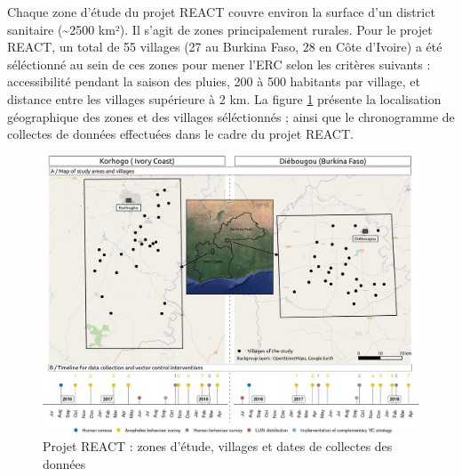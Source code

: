 \documentclass[12pt,twoside]{reedthesis}
\begin{document}
Chaque zone d'étude du projet REACT couvre environ la surface d'un district sanitaire (\textasciitilde2500 km²). Il s'agit de zones principalement rurales. Pour le projet REACT, un total de 55 villages (27 au Burkina Faso, 28 en Côte d'Ivoire) a été séléctionné au sein de ces zones pour mener l'ERC selon les critères suivants : accessibilité pendant la saison des pluies, 200 à 500 habitants par village, et distance entre les villages supérieure à 2 km. La figure \ref{fig:study-areas} présente la localisation géographique des zones et des villages séléctionnés ; ainsi que le chronogramme de collectes de données effectuées dans le cadre du projet REACT.
\begin{figure}

{\centering \includegraphics[width=1\linewidth]{figure/carte_zones_react} 

}

\caption[Zones d'étude et villages du projet REACT]{Projet REACT : zones d'étude, villages et dates de collectes des données}\label{fig:study-areas}
\end{figure}
\end{document}

